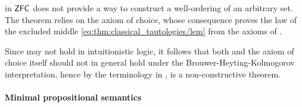 \begin{example}\label{ex:con:brouwer_heyting_kolmogorov_interpretation/well_ordering_principle_zfc}
   in \hyperref[def:zfc]{\( \textsf{ZFC} \)} does not provide a way to construct a well-ordering of an arbitrary set. The theorem relies on the axiom of choice, whose consequence  proves the law of the excluded middle \eqref{eq:thm:classical_tautologies/lem} from the axioms of .

  Since  may not hold in intuitionistic logic, it follows that both  and the axiom of choice itself should not in general hold under the Brouwer-Heyting-Kolmogorov interpretation, hence by the terminology in ,  is a non-constructive theorem.
\end{example}

\paragraph{Minimal propositional semantics}


